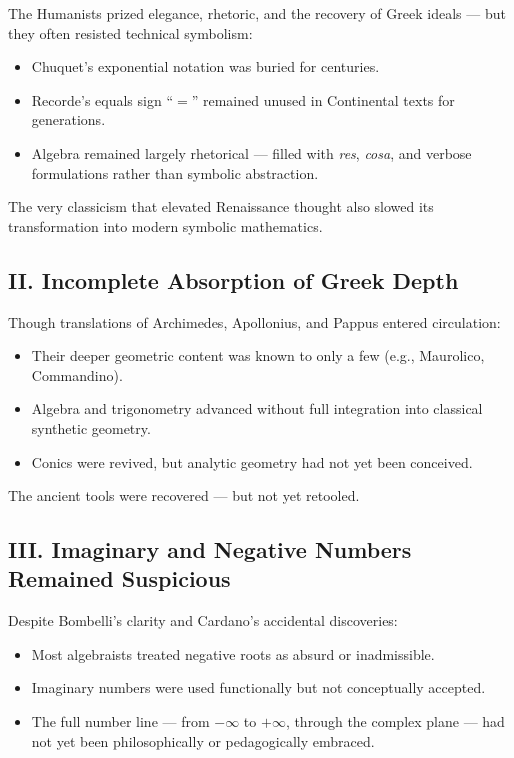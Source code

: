 \documentclass[9pt]{article}
\begin{document}
The Humanists prized elegance, rhetoric, and the recovery of Greek ideals — but they often resisted technical symbolism:

\begin{itemize}
    \item Chuquet’s exponential notation was buried for centuries.
    \item Recorde’s equals sign ``$=$'' remained unused in Continental texts for generations.
    \item Algebra remained largely rhetorical — filled with \textit{res}, \textit{cosa}, and verbose formulations rather than symbolic abstraction.
\end{itemize}

The very classicism that elevated Renaissance thought also slowed its transformation into modern symbolic mathematics.

\subsection*{II. Incomplete Absorption of Greek Depth}

Though translations of Archimedes, Apollonius, and Pappus entered circulation:

\begin{itemize}
    \item Their deeper geometric content was known to only a few (e.g., Maurolico, Commandino).
    \item Algebra and trigonometry advanced without full integration into classical synthetic geometry.
    \item Conics were revived, but analytic geometry had not yet been conceived.
\end{itemize}

The ancient tools were recovered — but not yet retooled.

\subsection*{III. Imaginary and Negative Numbers Remained Suspicious}

Despite Bombelli’s clarity and Cardano’s accidental discoveries:

\begin{itemize}
    \item Most algebraists treated negative roots as absurd or inadmissible.
    \item Imaginary numbers were used functionally but not conceptually accepted.
    \item The full number line — from $-\infty$ to $+\infty$, through the complex plane — had not yet been philosophically or pedagogically embraced.
\end{itemize}
\end{document}
